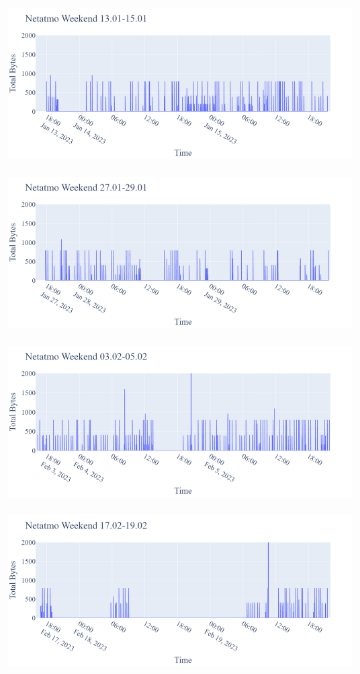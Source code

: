 \begin{figure}[H]
    \begin{subfigure}[b]{0.47\textwidth}
    \centering
        \includegraphics[width=1.1\hsize]{figures/Netatmo_Weekend_BigBytes_13.01-15.01.png}
    \end{subfigure}
    \begin{subfigure}[b]{0.47\textwidth}
        \includegraphics[width=1.1\hsize]{figures/Netatmo_Weekend_BigBytes_27.01-29.01.png}
    \end{subfigure}
    \begin{subfigure}[b]{0.47\textwidth}
        \includegraphics[width=1.1\hsize]{figures/Netatmo_Weekend_BigBytes_03.02-05.02.png}
    \end{subfigure}
    \begin{subfigure}[b]{0.47\textwidth}
        \includegraphics[width=1.1\hsize]{figures/Netatmo_Weekend_BigBytes_17.02-19.02.png}

\end{subfigure}
\end{figure}
